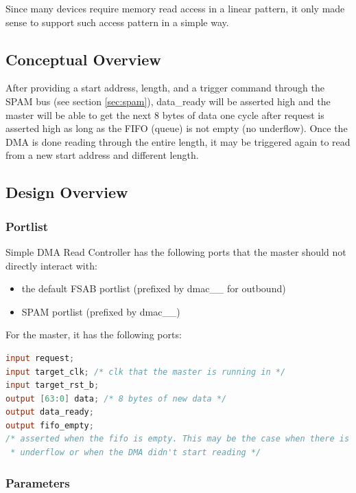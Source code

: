 \documentclass[10pt]{article}
\begin{document}
Since many devices require memory read access in a linear pattern, it only
made sense to support such access pattern in a simple way.

\subsection{Conceptual Overview}

After providing a start address, length, and a trigger command through the
SPAM bus (see section \ref{sec:spam}), data\_ready will be asserted high and
the master will be able to get the next 8 bytes of data one cycle after
request is asserted high as long as the FIFO (queue) is not empty (no
underflow).  Once the DMA is done reading through the entire length, it may
be triggered again to read from a new start address and different length.

\subsection{Design Overview}

\subsubsection{Portlist}

Simple DMA Read Controller has the following ports that the master should
not directly interact with:

\begin{itemize}
\item{the default FSAB portlist (prefixed by dmac\_\_ for outbound)}
\item{SPAM portlist (prefixed by dmac\_\_)}
\end{itemize}

For the master, it has the following ports:

\begin{lstlisting}[basicstyle=\footnotesize,language=Verilog]
input request; 
input target_clk; /* clk that the master is running in */
input target_rst_b;
output [63:0] data; /* 8 bytes of new data */
output data_ready;
output fifo_empty; 
/* asserted when the fifo is empty. This may be the case when there is an
 * underflow or when the DMA didn't start reading */
\end{lstlisting}

\subsubsection{Parameters}
\end{document}
